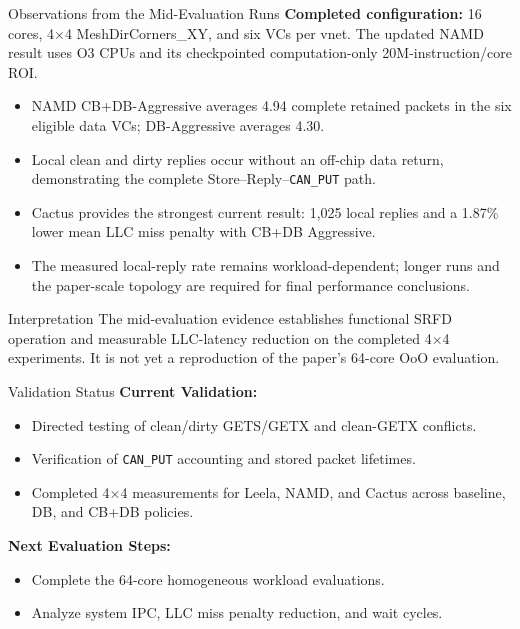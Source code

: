 \documentclass[aspectratio=169,11pt]{beamer}
\begin{document}
\begin{frame}{Observations from the Mid-Evaluation Runs}
  \textbf{Completed configuration:} 16 cores, 4$\times$4 MeshDirCorners\_XY,
  and six VCs per vnet. The updated NAMD result uses O3 CPUs and its
  checkpointed computation-only 20M-instruction/core ROI.
  \begin{itemize}
    \item NAMD CB+DB-Aggressive averages 4.94 complete retained packets in the six eligible data VCs; DB-Aggressive averages 4.30.
    \item Local clean and dirty replies occur without an off-chip data return, demonstrating the complete Store--Reply--\texttt{CAN\_PUT} path.
    \item Cactus provides the strongest current result: 1,025 local replies and a 1.87\% lower mean LLC miss penalty with CB+DB Aggressive.
    \item The measured local-reply rate remains workload-dependent; longer runs and the paper-scale topology are required for final performance conclusions.
  \end{itemize}

  \vspace{0.15cm}
  \begin{alertblock}{Interpretation}
    The mid-evaluation evidence establishes functional SRFD operation and measurable LLC-latency reduction on the completed 4$\times$4 experiments. It is not yet a reproduction of the paper's 64-core OoO evaluation.
  \end{alertblock}
\end{frame}

\begin{frame}{Validation Status}
  \textbf{Current Validation:}
  \begin{itemize}
    \item Directed testing of clean/dirty GETS/GETX and clean-GETX conflicts.
    \item Verification of \texttt{CAN\_PUT} accounting and stored packet lifetimes.
    \item Completed 4$\times$4 measurements for Leela, NAMD, and Cactus across baseline, DB, and CB+DB policies.
  \end{itemize}

  \vspace{0.25cm}
  \textbf{Next Evaluation Steps:}
  \begin{itemize}
    \item Complete the 64-core homogeneous workload evaluations.
    \item Analyze system IPC, LLC miss penalty reduction, and wait cycles.
  \end{itemize}
\end{frame}
\end{document}
